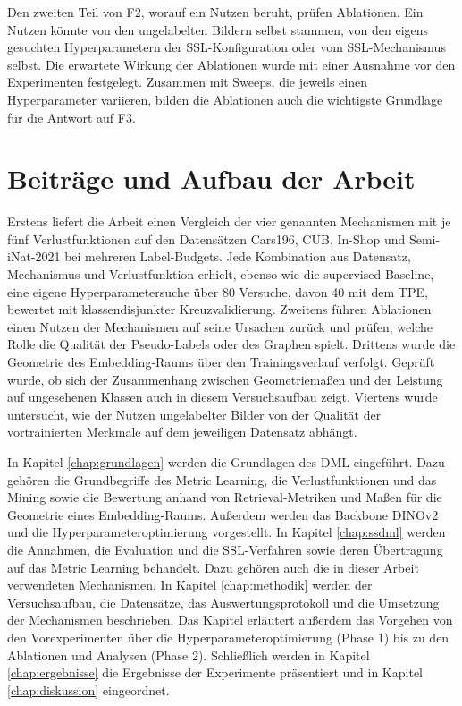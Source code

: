 Den zweiten Teil von F2, worauf ein Nutzen beruht, prüfen Ablationen. Ein Nutzen könnte von den ungelabelten Bildern selbst stammen, von den eigens gesuchten Hyperparametern der \ac{SSL}-Konfiguration oder vom \ac{SSL}-Mechanismus selbst. Die erwartete Wirkung der Ablationen wurde mit einer Ausnahme vor den Experimenten festgelegt. Zusammen mit Sweeps, die jeweils einen Hyperparameter variieren, bilden die Ablationen auch die wichtigste Grundlage für die Antwort auf F3.

\section{Beiträge und Aufbau der Arbeit}

Erstens liefert die Arbeit einen Vergleich der vier genannten Mechanismen mit je fünf Verlustfunktionen auf den Datensätzen Cars196, \ac{CUB}, In-Shop und Semi-iNat-2021 bei mehreren Label-Budgets. Jede Kombination aus Datensatz, Mechanismus und Verlustfunktion erhielt, ebenso wie die supervised Baseline, eine eigene Hyperparametersuche über 80 Versuche, davon 40 mit dem \ac{TPE}, bewertet mit klassendisjunkter Kreuzvalidierung. Zweitens führen Ablationen einen Nutzen der Mechanismen auf seine Ursachen zurück und prüfen, welche Rolle die Qualität der Pseudo-Labels oder des Graphen spielt. Drittens wurde die Geometrie des Embedding-Raums über den Trainingsverlauf verfolgt. Geprüft wurde, ob sich der Zusammenhang zwischen Geometriemaßen und der Leistung auf ungesehenen Klassen \cite{roth_revisiting_2020,milbich_characterizing_2021} auch in diesem Versuchsaufbau zeigt. Viertens wurde untersucht, wie der Nutzen ungelabelter Bilder von der Qualität der vortrainierten Merkmale auf dem jeweiligen Datensatz abhängt.

In Kapitel \ref{chap:grundlagen} werden die Grundlagen des \ac{DML} eingeführt. Dazu gehören die Grundbegriffe des Metric Learning, die Verlustfunktionen und das Mining sowie die Bewertung anhand von Retrieval-Metriken und Maßen für die Geometrie eines Embedding-Raums. Außerdem werden das Backbone DINOv2 und die Hyperparameteroptimierung vorgestellt. In Kapitel \ref{chap:ssdml} werden die Annahmen, die Evaluation und die \ac{SSL}-Verfahren sowie deren Übertragung auf das Metric Learning behandelt. Dazu gehören auch die in dieser Arbeit verwendeten Mechanismen. In Kapitel \ref{chap:methodik} werden der Versuchsaufbau, die Datensätze, das Auswertungsprotokoll und die Umsetzung der Mechanismen beschrieben. Das Kapitel erläutert außerdem das Vorgehen von den Vorexperimenten über die Hyperparameteroptimierung (Phase 1) bis zu den Ablationen und Analysen (Phase 2). Schließlich werden in Kapitel \ref{chap:ergebnisse} die Ergebnisse der Experimente präsentiert und in Kapitel \ref{chap:diskussion} eingeordnet.